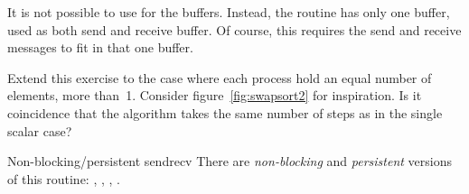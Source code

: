 \begin{remark}
  It is not possible to use  for the buffers.
  Instead, the routine  has only one buffer,
  used as both send and receive buffer.
  Of course, this requires the send and receive messages
  to fit in that one buffer.
\end{remark}

\begin{exercise}
  Extend this exercise to the case where each process hold an equal
  number of elements, more than~1. Consider figure~\ref{fig:swapsort2}
  for inspiration. Is it coincidence that the algorithm takes the same
  number of steps as in the single scalar case?
\end{exercise}

\begin{mpifournote}{Non-blocking/persistent sendrecv}
  There are
  \emph{non-blocking}
  and
  \emph{persistent}
  versions of this routine:
  , ,
  , .
\end{mpifournote}
